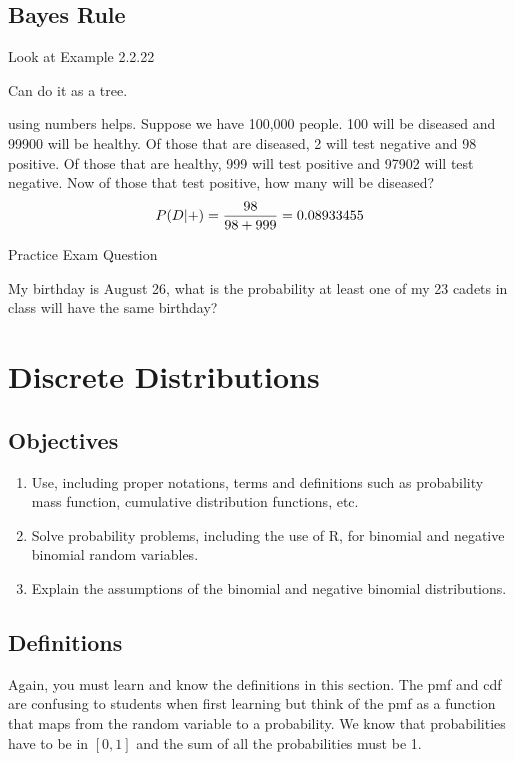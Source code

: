\documentclass[]{book}
\providecommand{\tightlist}{%
  \setlength{\itemsep}{0pt}\setlength{\parskip}{0pt}}
\theoremstyle{definition}
\theoremstyle{definition}
\theoremstyle{definition}
\theoremstyle{remark}
\begin{document}
\subsection{Bayes Rule}\label{bayes-rule}

Look at Example 2.2.22

Can do it as a tree.

using numbers helps. Suppose we have 100,000 people. 100 will be
diseased and 99900 will be healthy. Of those that are diseased, 2 will
test negative and 98 positive. Of those that are healthy, 999 will test
positive and 97902 will test negative. Now of those that test positive,
how many will be diseased? \[P(D|+)={98 \over 98+999}=0.08933455\]

Practice Exam Question

My birthday is August 26, what is the probability at least one of my 23
cadets in class will have the same birthday?

\hypertarget{L7}{\section{Discrete Distributions}\label{L7}}

\subsection{Objectives}\label{objectives-6}

\begin{enumerate}
\def\labelenumi{\arabic{enumi}.}
\tightlist
\item
  Use, including proper notations, terms and definitions such as
  probability mass function, cumulative distribution functions, etc.\\
\item
  Solve probability problems, including the use of R, for binomial and
  negative binomial random variables.\\
\item
  Explain the assumptions of the binomial and negative binomial
  distributions.
\end{enumerate}

\subsection{Definitions}\label{definitions-1}

Again, you must learn and know the definitions in this section. The pmf
and cdf are confusing to students when first learning but think of the
pmf as a function that maps from the random variable to a probability.
We know that probabilities have to be in \([0,1]\) and the sum of all
the probabilities must be 1.
\end{document}
